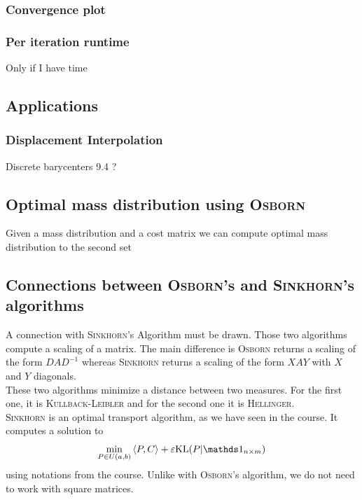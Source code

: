\subsubsection{Convergence plot}



\subsubsection{Per iteration runtime}

Only if I have time

\subsection{Applications}

\subsubsection{Displacement Interpolation}
\cite{peyre2011numerical}

Discrete barycenters 9.4 ?

\subsection{Optimal mass distribution using \textsc{Osborn}}

Given a mass distribution and a cost matrix we can compute optimal mass distribution to the second set

\subsection{Connections between \textsc{Osborn}'s and \textsc{Sinkhorn}'s algorithms}

A connection with \textsc{Sinkhorn}'s Algorithm must be drawn. Those two algorithms compute a scaling of a matrix. The main difference is \textsc{Osborn} returns a scaling of the form \(D A D^{-1}\) whereas \textsc{Sinkhorn} returns a scaling of the form \(XAY\) with \(X\) and \(Y\) diagonals.\\

These two algorithms minimize a distance between two measures. For the first one, it is \textsc{Kullback-Leibler} and for the second one it is \textsc{Hellinger}.\\

\textsc{Sinkhorn} is an optimal transport algorithm, as we have seen in the course. It computes a solution to
\[
    \min_{P \in U(a,b)} \left\langle P, C\right\rangle + \varepsilon \text{KL}(P|\un_{n \times m})  
\]
using notations from the course. Unlike with \textsc{Osborn}'s algorithm, we do not need to work with square matrices.\\

